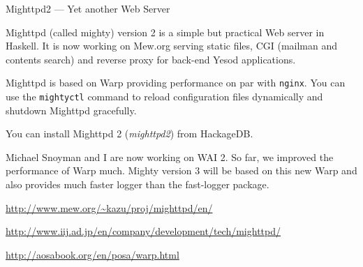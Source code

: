 \begin{hcarentry}{Mighttpd2 --- Yet another Web Server}
\label{mighttpd2}
\makeheader

Mighttpd (called mighty) version 2 is a simple but practical Web server in Haskell.
It is now working on Mew.org serving static files, CGI (mailman and contents search) and reverse proxy for back-end Yesod applications.

Mighttpd is based on Warp providing
performance on par with {\tt nginx}.
You can use the {\tt mightyctl} command to
reload configuration files dynamically and shutdown Mighttpd gracefully.

You can install Mighttpd 2 ({\it mighttpd2}) from HackageDB.

Michael Snoyman and I are now working on WAI 2. So far, we improved the performance of Warp much. Mighty version 3 will be based on this new Warp and also provides much faster logger than the fast-logger package.

\FurtherReading
\begin{compactitem}
\item \url{http://www.mew.org/~kazu/proj/mighttpd/en/}
\item \url{http://www.iij.ad.jp/en/company/development/tech/mighttpd/}
\item \url{http://aosabook.org/en/posa/warp.html}
\end{compactitem}
\end{hcarentry}
